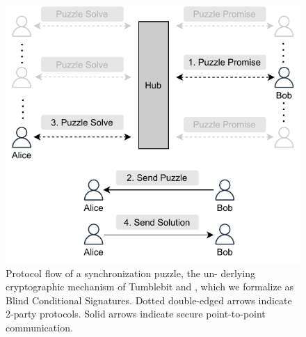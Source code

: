 \begin{figure}[htb]
    \centering
    \includegraphics[width=0.7\linewidth]{syncpuzzle.pdf}
    \caption{Protocol flow of a synchronization puzzle, the un-
    derlying cryptographic mechanism of Tumblebit and \AAL, which we formalize as Blind Conditional Signatures.
    Dotted double-edged arrows indicate 2-party protocols. Solid arrows indicate secure point-to-point communication.}
    \label{fig:syncpuzzle_overview}
  \end{figure}


